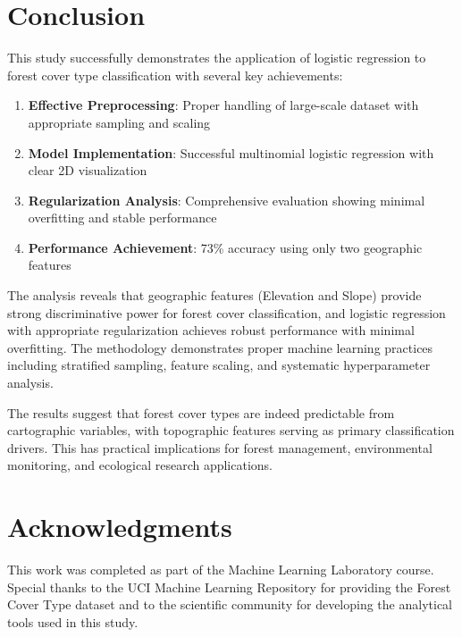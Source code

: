 \documentclass[12pt,a4paper]{article}
\begin{document}
\section{Conclusion}

This study successfully demonstrates the application of logistic regression to forest cover type classification with several key achievements:

\begin{enumerate}
    \item \textbf{Effective Preprocessing}: Proper handling of large-scale dataset with appropriate sampling and scaling
    \item \textbf{Model Implementation}: Successful multinomial logistic regression with clear 2D visualization
    \item \textbf{Regularization Analysis}: Comprehensive evaluation showing minimal overfitting and stable performance
    \item \textbf{Performance Achievement}: 73\% accuracy using only two geographic features
\end{enumerate}

The analysis reveals that geographic features (Elevation and Slope) provide strong discriminative power for forest cover classification, and logistic regression with appropriate regularization achieves robust performance with minimal overfitting. The methodology demonstrates proper machine learning practices including stratified sampling, feature scaling, and systematic hyperparameter analysis.

The results suggest that forest cover types are indeed predictable from cartographic variables, with topographic features serving as primary classification drivers. This has practical implications for forest management, environmental monitoring, and ecological research applications.

\section*{Acknowledgments}
This work was completed as part of the Machine Learning Laboratory course. Special thanks to the UCI Machine Learning Repository for providing the Forest Cover Type dataset and to the scientific community for developing the analytical tools used in this study.
\end{document}
